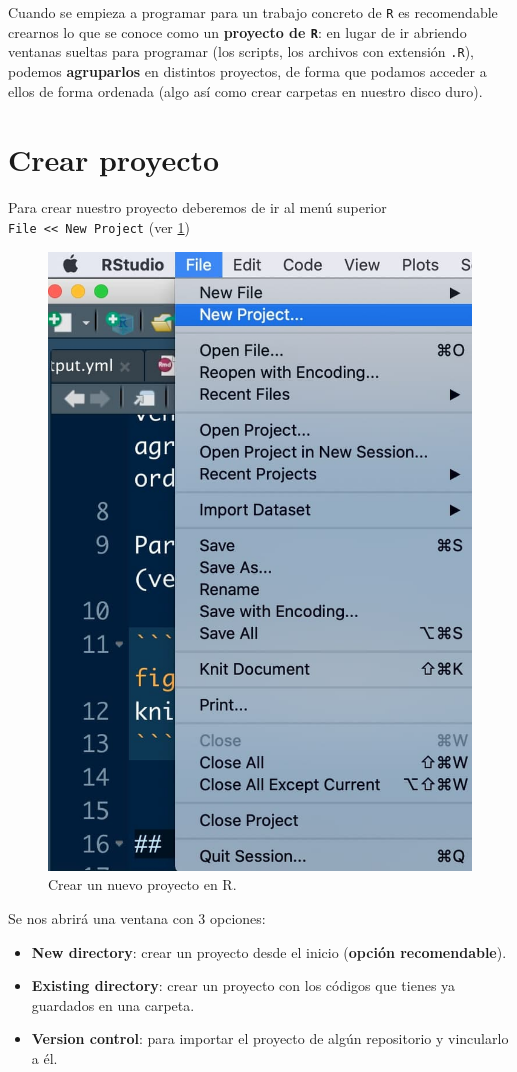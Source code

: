\documentclass[11pt,]{book}
\begin{document}
Cuando se empieza a programar para un trabajo concreto de \texttt{R} es recomendable crearnos lo que se conoce como un \textbf{proyecto de \texttt{R}}: en lugar de ir abriendo ventanas sueltas para programar (los scripts, los archivos con extensión \texttt{.R}), podemos \textbf{agruparlos} en distintos proyectos, de forma que podamos acceder a ellos de forma ordenada (algo así como crear carpetas en nuestro disco duro).

\hypertarget{crear-proyecto}{%
\section{Crear proyecto}\label{crear-proyecto}}

Para crear nuestro proyecto deberemos de ir al menú superior \texttt{File\ \textless{}\textless{}\ New\ Project} (ver \ref{fig:crear-proyecto1})

\begin{figure}

{\centering \includegraphics[width=0.5\linewidth]{./img/crear_proyecto1} 

}

\caption{Crear un nuevo proyecto en R.}\label{fig:crear-proyecto1}
\end{figure}

Se nos abrirá una ventana con 3 opciones:

\begin{itemize}
\item
  \textbf{New directory}: crear un proyecto desde el inicio (\textbf{opción recomendable}).
\item
  \textbf{Existing directory}: crear un proyecto con los códigos que tienes ya guardados en una carpeta.
\item
  \textbf{Version control}: para importar el proyecto de algún repositorio y vincularlo a él.
\end{itemize}
\end{document}
